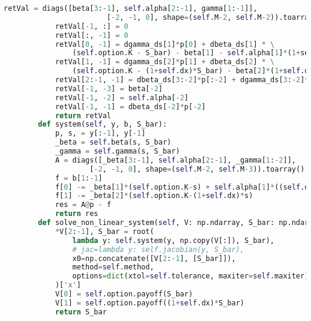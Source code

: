 \begin{lstlisting}[language=Python, caption=Implicit solver for Nielsen transformation]
            retVal = diags([beta[3:-1], self.alpha[2:-1], gamma[1:-1]],
                        [-2, -1, 0], shape=(self.M-2, self.M-2)).toarray()
            retVal[-1, :] = 0
            retVal[:, -1] = 0
            retVal[0, -1] = dgamma_ds[1]*p[0] + dbeta_ds[1] * \
                (self.option.K - S_bar) - beta[1] - self.alpha[1]*(1+self.dx)
            retVal[1, -1] = dgamma_ds[2]*p[1] + dbeta_ds[2] * \
                (self.option.K - (1+self.dx)*S_bar) - beta[2]*(1+self.dx)
            retVal[2:-1, -1] = dbeta_ds[3:-2]*p[:-2] + dgamma_ds[3:-2]*p[2:]
            retVal[-1, -3] = beta[-2]
            retVal[-1, -2] = self.alpha[-2]
            retVal[-1, -1] = dbeta_ds[-2]*p[-2]
            return retVal
        def system(self, y, b, S_bar):
            p, s, = y[:-1], y[-1]
            _beta = self.beta(s, S_bar)
            _gamma = self.gamma(s, S_bar)
            A = diags([_beta[3:-1], self.alpha[2:-1], _gamma[1:-2]],
                    [-2, -1, 0], shape=(self.M-2, self.M-3)).toarray()
            f = b[1:-1]
            f[0] -= _beta[1]*(self.option.K-s) + self.alpha[1]*((self.option.K-(1+self.dx)*s))
            f[1] -= _beta[2]*(self.option.K-(1+self.dx)*s)
            res = A@p - f
            return res
        def solve_non_linear_system(self, V: np.ndarray, S_bar: np.ndarray):
            *V[2:-1], S_bar = root(
                lambda y: self.system(y, np.copy(V[:]), S_bar),
                # jac=lambda y: self.jacobian(y, S_bar),
                x0=np.concatenate([V[2:-1], [S_bar]]),
                method=self.method,
                options=dict(xtol=self.tolerance, maxiter=self.maxiter)
            )['x']
            V[0] = self.option.payoff(S_bar)
            V[1] = self.option.payoff((1+self.dx)*S_bar)    
            return S_bar
\end{lstlisting}

